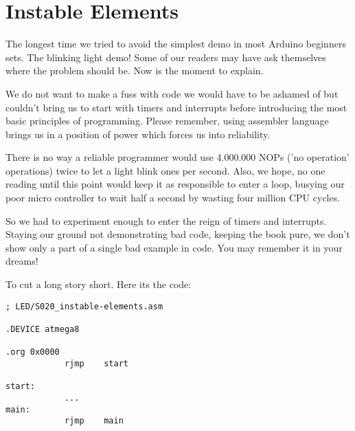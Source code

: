 \section{Instable Elements}

The longest time we tried to avoid the simplest demo in most Arduino beginners sets. The blinking light demo! Some of our readers may have ask themselves where the problem should be. Now is the moment to explain.

We do not want to make a fuss with code we would have to be ashamed of but couldn't bring us to start with timers and interrupts before introducing the most basic principles of programming. Please remember, using assembler language brings us in a position of power which forces us into reliability.

There is no way a reliable programmer would use 4.000.000 NOPs ('no operation' operations) twice to let a light blink ones per second. Also, we hope, no one reading until this point would keep it as responsible to enter a loop, busying our poor micro controller to wait half a second by wasting four million CPU cycles.

So we had to experiment enough to enter the reign of timers and interrupts. Staying our ground not demonstrating bad code, keeping the book pure, we don't show only a part of a single bad example in code. You may remember it in your dreams!

To cut a long story short. Here its the code:

\begin{lstlisting}
; LED/S020_instable-elements.asm

.DEVICE atmega8

.org 0x0000
            rjmp    start 

start:
            ...            
main:
            rjmp    main
\end{lstlisting}
